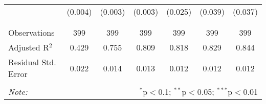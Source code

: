 \begin{table}[!htbp]
\begin{tabular}{@{\extracolsep{5pt}}lcccccc}
  & (0.004) & (0.003) & (0.003) & (0.025) & (0.039) & (0.037) \\ 
  & & & & & & \\ 
\hline \\[-1.8ex] 
Observations & 399 & 399 & 399 & 399 & 399 & 399 \\ 
Adjusted R$^{2}$ & 0.429 & 0.755 & 0.809 & 0.818 & 0.829 & 0.844 \\ 
Residual Std. Error & 0.022 & 0.014 & 0.013 & 0.012 & 0.012 & 0.012 \\ 
\hline 
\hline \\[-1.8ex] 
\textit{Note:}  & \multicolumn{6}{r}{$^{*}$p$<$0.1; $^{**}$p$<$0.05; $^{***}$p$<$0.01} \\ 
\end{tabular} 
\end{table} 
